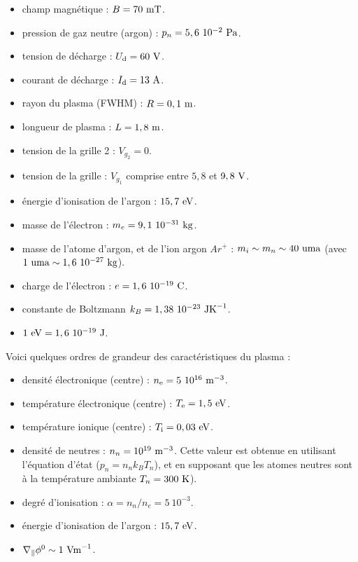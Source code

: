 \documentclass{book}
\begin{document}
\begin{itemize}
\item     champ magn\'etique : $B=70\ {\rm mT}$.
\item      pression de gaz neutre (argon) : $p_n=5,6\ 10^{-2}\ {\rm Pa}$. 
\item      tension de d\'echarge    :        $U_{\rm d}=60\ {\rm V}$.
\item      courant de d\'echarge    :       $I_{\rm d}=13\ {\rm A}$.
\item      rayon du plasma (FWHM)    :      $R=0,1\ {\rm m}$.
\item      longueur de plasma       :        $L=1,8\ {\rm m}$.
\item tension de la grille 2 : $V_{g_2}=0$.
\item tension de la grille  : $V_{g_1}$ comprise entre $5,8$ et
$9,8\ {\rm V}$.
\item \'energie d'ionisation de l'argon : $15,7\ {\rm eV}$.
\item masse de l'\'electron : $m_e=9,1\ 10^{-31}\ {\rm kg}$.
\item masse de l'atome d'argon, et de l'ion argon $Ar^+$ : $m_i\sim
m_n\sim 40\ {\rm uma}$ (avec $1\ {\rm uma}\sim 1,6\ 10^{-27}\ {\rm kg}$).
\item charge de l'\'electron : $e=1,6\ 10^{-19}\ {\rm C}$.
\item constante de Boltzmann $k_B=1,38\ 10^{-23}\ {\rm JK}^{-1}$.
\item $1\ {\rm eV}=1,6\ 10^{-19}\ {\rm J}$.
\end{itemize}


Voici quelques ordres de grandeur des caract\'eristiques du plasma :

\begin{itemize}
\item densit\'e \'electronique (centre) :     $n_{\rm e}=5\ 10^{16}\ {\rm m}^{-3}$.
\item temp\'erature \'electronique (centre) :  $T_{\rm e}=1,5\ {\rm eV}$.
\item temp\'erature ionique (centre)  :   $T_{\rm i}=0,03\ {\rm eV}$.
\item densit\'e de neutres : $n_n=10^{19}\ {\rm m}^{-3}$. Cette valeur est
obtenue en utilisant l'\'equation d'\'etat ($p_n=n_n k_B T_n$), 
et en supposant que les atomes neutres sont \`a la temp\'erature ambiante
$T_n=300\ {\rm K}$).  
\item degr\'e d'ionisation : $\alpha=n_n/n_e=5\ 10^{-3}$.
\item \'energie d'ionisation de l'argon : $15,7\ {\rm eV}$.
\item $\nabla_\parallel\phi^0\sim 1\ {\rm Vm}^{-1}$.
\end{itemize}
\end{document}
